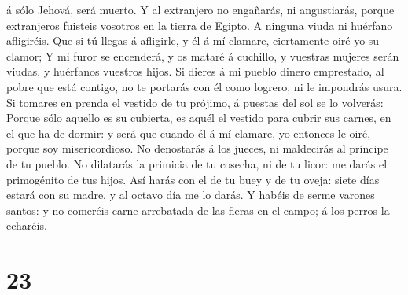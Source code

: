 á sólo Jehová, será muerto.  Y al extranjero no
engañarás, ni angustiarás, porque extranjeros fuisteis vosotros en la
tierra de Egipto.  A ninguna viuda ni huérfano
afligiréis.  Que si tú llegas á afligirle, y él á mí
clamare, ciertamente oiré yo su clamor;  Y mi furor se
encenderá, y os mataré á cuchillo, y vuestras mujeres serán viudas, y
huérfanos vuestros hijos.  Si dieres á mi pueblo dinero
emprestado, al pobre que está contigo, no te portarás con él como
logrero, ni le impondrás usura.  Si tomares en prenda el
vestido de tu prójimo, á puestas del sol se lo volverás: 
Porque sólo aquello es su cubierta, es aquél el vestido para cubrir sus
carnes, en el que ha de dormir: y será que cuando él á mí clamare, yo
entonces le oiré, porque soy misericordioso.  No
denostarás á los jueces, ni maldecirás al príncipe de tu pueblo.
 No dilatarás la primicia de tu cosecha, ni de tu licor:
me darás el primogénito de tus hijos.  Así harás con el
de tu buey y de tu oveja: siete días estará con su madre, y al octavo
día me lo darás.  Y habéis de serme varones santos: y no
comeréis carne arrebatada de las fieras en el campo; á los perros la
echaréis.

\hypertarget{section-22}{%
\section{23}\label{section-22}}

